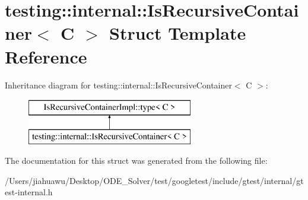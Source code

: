 \hypertarget{structtesting_1_1internal_1_1_is_recursive_container}{}\section{testing\+:\+:internal\+:\+:Is\+Recursive\+Container$<$ C $>$ Struct Template Reference}
\label{structtesting_1_1internal_1_1_is_recursive_container}
Inheritance diagram for testing\+:\+:internal\+:\+:Is\+Recursive\+Container$<$ C $>$\+:\begin{figure}[H]
\begin{center}
\leavevmode
\includegraphics[height=2.000000cm]{structtesting_1_1internal_1_1_is_recursive_container}
\end{center}
\end{figure}


The documentation for this struct was generated from the following file\+:\begin{DoxyCompactItemize}
\item 
/\+Users/jiahuawu/\+Desktop/\+O\+D\+E\+\_\+\+Solver/test/googletest/include/gtest/internal/gtest-\/internal.\+h\end{DoxyCompactItemize}
